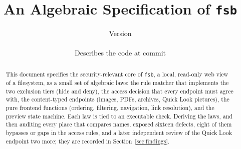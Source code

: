 \documentclass[11pt]{article}
\title{An Algebraic Specification of \texttt{fsb}}
\author{}
\date{Version \fsbversion \\ \fsbcodedate \\ \small Describes the code at commit \texttt{\fsbcommit}}
\begin{document}
\maketitle
\begin{abstract}
This document specifies the security-relevant core of \texttt{fsb}, a local,
read-only web view of a filesystem, as a small set of algebraic laws: the rule
matcher that implements the two exclusion tiers (hide and deny), the access
decision that every endpoint must agree with, the content-typed endpoints
(images, PDFs, archives, Quick Look pictures), the pure frontend functions (ordering, filtering,
navigation, link resolution), and the preview state machine.  Each law is tied
to an executable check.  Deriving the laws, and then auditing every place that compares names,
exposed sixteen defects, eight of them bypasses or gaps in the access rules, and a
later independent review of the Quick Look endpoint two more; they are recorded in
Section~\ref{sec:findings}.
\end{abstract}

\tableofcontents











\end{document}
